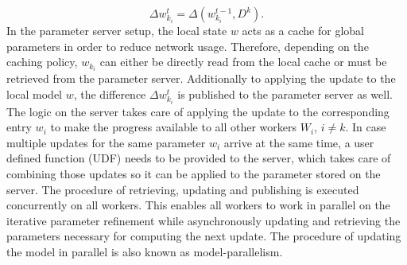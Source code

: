 \begin{equation}
\Delta w_{k_i}^{t} = \Delta(w_{k_i}^{t-1},D^k).
\label{eqn:local_delta_upd_param}
\end{equation}
In the parameter server setup, the local state $w$ acts as a cache for global parameters in order to reduce network usage.
Therefore, depending on the caching policy, $w_{k_i}$ can either be directly read from the local cache or must be retrieved from the parameter server.
Additionally to applying the update to the local model $w$, the difference $\Delta w_{k_i}^{t}$ is published to the parameter server as well.
The logic on the server takes care of applying the update to the corresponding entry $w_i$ to make the progress available to all other workers $W_i$, $i \neq k$.
In case multiple updates for the same parameter $w_i$ arrive at the same time, a user defined function (UDF) needs to be provided to the server, which takes care of combining those updates so it can be applied to the parameter stored on the server.
The procedure of retrieving, updating and publishing is executed concurrently on all workers.
This enables all workers to work in parallel on the iterative parameter refinement while asynchronously updating and retrieving the parameters necessary for computing the next update.
The procedure of updating the model in parallel is also known as model-parallelism.

